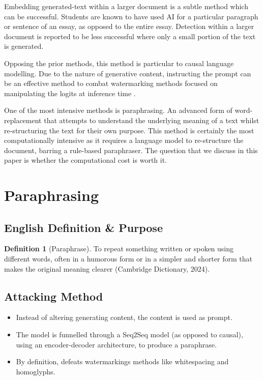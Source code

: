 \documentclass{l4proj}
\theoremstyle{definition}
\newtheorem{definition}{Definition}[section]
\begin{document}
        Embedding generated-text within a larger document is a subtle method which can be successful. Students are known to have used AI for a particular paragraph or sentence of an essay, as opposed to the entire essay. Detection within a larger document is reported to be less successful \cite{okay okay, pray for the source} where only a small portion of the text is generated. 

        Opposing the prior methods, this method is particular to causal language modelling. Due to the nature of generative content, instructing the prompt can be an effective method to combat watermarking methods focused on manipulating the logits at inference time \citep{kirchenbauer2023watermark}. 

        One of the most intensive methods is paraphrasing. An advanced form of word-replacement that attempts to understand the underlying meaning of a text whilst re-structuring the text for their own purpose. This method is certainly the most computationally intensive as it requires a language model to re-structure the document, barring a rule-based paraphraser. The question that we discuss in this paper is whether the computational cost is worth it. 

\section{Paraphrasing}
    \subsection{English Definition \& Purpose}
        \begin{definition}[Paraphrase]
            To repeat something written or spoken using different words, often in a humorous form or in a simpler and shorter form that makes the original meaning clearer (Cambridge Dictionary, 2024).
        \end{definition}
    \subsection{Attacking Method}
        \begin{itemize}
            \setlength\itemsep{0.5em}
            \item Instead of altering generating content, the content is used as prompt.
            \item The model is funnelled through a Seq2Seq model (as opposed to causal), using an encoder-decoder architecture, to produce a paraphrase.
            \item By definition, defeats watermarkings methods like whitespacing and homoglyphs. 
        \end{itemize}
\end{document}

